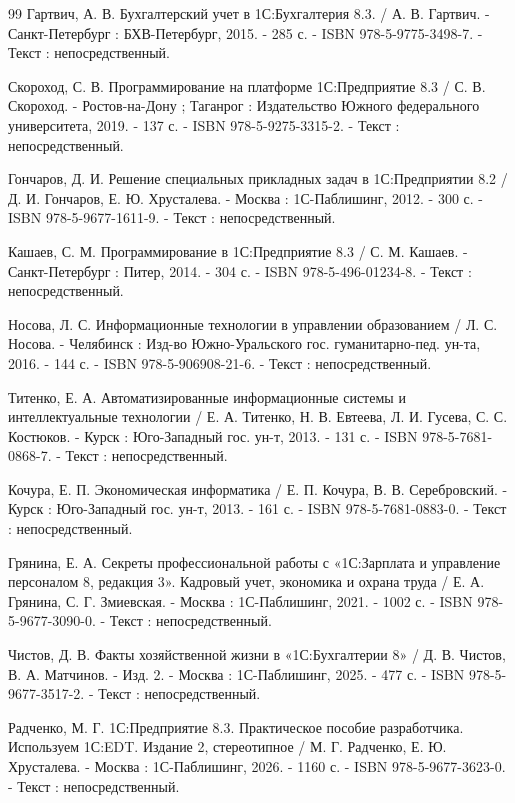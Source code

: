 \begin{thebibliography}{99}
	 Гартвич, А. В. Бухгалтерский учет в 1С:Бухгалтерия 8.3. / А. В. Гартвич. - Санкт-Петербург : БХВ-Петербург, 2015. - 285 с. - ISBN 978-5-9775-3498-7. - Текст : непосредственный.
	
	 Скороход, С. В. Программирование на платформе 1С:Предприятие 8.3 / С. В. Скороход. - Ростов-на-Дону ; Таганрог : Издательство Южного федерального университета, 2019. - 137 с. - ISBN 978-5-9275-3315-2. - Текст : непосредственный.
	
	 Гончаров, Д. И. Решение специальных прикладных задач в 1С:Предприятии 8.2 / Д. И. Гончаров, Е. Ю. Хрусталева. - Москва : 1С-Паблишинг, 2012. - 300 с. - ISBN 978-5-9677-1611-9. - Текст : непосредственный.
	
	 Кашаев, С. М. Программирование в 1С:Предприятие 8.3 / С. М. Кашаев. - Санкт-Петербург : Питер, 2014. - 304 с. - ISBN 978-5-496-01234-8. - Текст : непосредственный.
	
	 Носова, Л. С. Информационные технологии в управлении образованием / Л. С. Носова. - Челябинск : Изд-во Южно-Уральского гос. гуманитарно-пед. ун-та, 2016. - 144 с. - ISBN 978-5-906908-21-6. - Текст : непосредственный.
	
	 Титенко, Е. А. Автоматизированные информационные системы и интеллектуальные технологии / Е. А. Титенко, Н. В. Евтеева, Л. И. Гусева, С. С. Костюков. - Курск : Юго-Западный гос. ун-т, 2013. - 131 с. - ISBN 978-5-7681-0868-7. - Текст : непосредственный.
	
	 Кочура, Е. П. Экономическая информатика / Е. П. Кочура, В. В. Серебровский. - Курск : Юго-Западный гос. ун-т, 2013. - 161 с. - ISBN 978-5-7681-0883-0. - Текст : непосредственный.
	
	 Грянина, Е. А. Секреты профессиональной работы с «1С:Зарплата и управление персоналом 8, редакция 3». Кадровый учет, экономика и охрана труда / Е. А. Грянина, С. Г. Змиевская. - Москва : 1С-Паблишинг, 2021. - 1002 с. - ISBN 978-5-9677-3090-0. - Текст : непосредственный.
	
	 Чистов, Д. В. Факты хозяйственной жизни в «1С:Бухгалтерии 8» / Д. В. Чистов, В. А. Матчинов. - Изд. 2. - Москва : 1С-Паблишинг, 2025. - 477 с. - ISBN 978-5-9677-3517-2. - Текст : непосредственный.
	
	 Радченко, М. Г. 1С:Предприятие 8.3. Практическое пособие разработчика. Используем 1С:EDT. Издание 2, стереотипное / М. Г. Радченко, Е. Ю. Хрусталева. - Москва : 1С-Паблишинг, 2026. - 1160 с. - ISBN 978-5-9677-3623-0. - Текст : непосредственный.
	

\end{thebibliography}
